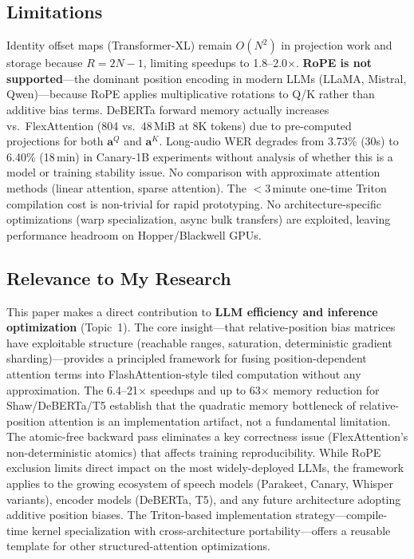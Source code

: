 \documentclass[11pt,a4paper]{article}
\begin{document}
\subsection{Limitations}
Identity offset maps (Transformer-XL) remain $O(N^2)$ in projection work and storage because $R = 2N{-}1$, limiting speedups to 1.8--2.0$\times$. \textbf{RoPE is not supported}---the dominant position encoding in modern LLMs (LLaMA, Mistral, Qwen)---because RoPE applies multiplicative rotations to Q/K rather than additive bias terms. DeBERTa forward memory actually increases vs.\ FlexAttention (804 vs.\ 48\,MiB at 8K tokens) due to pre-computed projections for both $\mathbf{a}^Q$ and $\mathbf{a}^K$. Long-audio WER degrades from 3.73\% (30s) to 6.40\% (18\,min) in Canary-1B experiments without analysis of whether this is a model or training stability issue. No comparison with approximate attention methods (linear attention, sparse attention). The $<$3\,minute one-time Triton compilation cost is non-trivial for rapid prototyping. No architecture-specific optimizations (warp specialization, async bulk transfers) are exploited, leaving performance headroom on Hopper/Blackwell GPUs.

\subsection{Relevance to My Research}
This paper makes a direct contribution to \textbf{LLM efficiency and inference optimization} (Topic~1). The core insight---that relative-position bias matrices have exploitable structure (reachable ranges, saturation, deterministic gradient sharding)---provides a principled framework for fusing position-dependent attention terms into FlashAttention-style tiled computation without any approximation. The 6.4--21$\times$ speedups and up to 63$\times$ memory reduction for Shaw/DeBERTa/T5 establish that the quadratic memory bottleneck of relative-position attention is an implementation artifact, not a fundamental limitation. The atomic-free backward pass eliminates a key correctness issue (FlexAttention's non-deterministic atomics) that affects training reproducibility. While RoPE exclusion limits direct impact on the most widely-deployed LLMs, the framework applies to the growing ecosystem of speech models (Parakeet, Canary, Whisper variants), encoder models (DeBERTa, T5), and any future architecture adopting additive position biases. The Triton-based implementation strategy---compile-time kernel specialization with cross-architecture portability---offers a reusable template for other structured-attention optimizations.
\end{document}
